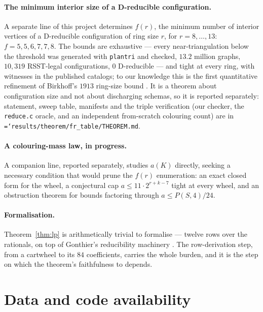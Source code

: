 \documentclass[11pt]{article}
\theoremstyle{definition}
\newcommand{\art}[1]{{\texttt{\hyphenchar\font=`\-\relax #1}}}
\begin{document}
\paragraph{The minimum interior size of a D-reducible configuration.} A separate
line of this project determines $f(r)$, the minimum number of interior vertices
of a D-reducible configuration of ring size $r$, for $r = 8,\dots,13$:
$f = 5,5,6,7,7,8$. The bounds are exhaustive --- every near-triangulation below
the threshold was generated with \texttt{plantri} and checked, $13.2$ million
graphs, $10{,}319$ RSST-legal configurations, $0$ D-reducible --- and tight at
every ring, with witnesses in the published catalogs; to our knowledge this is
the first quantitative refinement of Birkhoff's $1913$ ring-size bound
\cite{birkhoff1913}. It is a theorem about configuration size and not about
discharging schemas, so it is reported separately: statement, sweep table,
manifests and the triple verification (our checker, the \texttt{reduce.c} oracle,
and an independent from-scratch colouring count) are in
\art{results/theorem/fr\_table/THEOREM.md}.

\paragraph{A colouring-mass law, in progress.} A companion line, reported
separately, studies $a(K)$ directly, seeking a necessary condition that would prune
the $f(r)$ enumeration: an exact closed form for the wheel, a conjectural cap
$a \le 11\cdot2^{r+k-7}$ tight at every wheel, and an obstruction theorem for
bounds factoring through $a \le P(S,4)/24$.

\paragraph{Formalisation.} Theorem~\ref{thm:lp} is arithmetically trivial to
formalise --- twelve rows over the rationals, on top of Gonthier's reducibility
machinery \cite{gonthier2008}. The row-derivation step, from a cartwheel to its
$84$ coefficients, carries the whole burden, and it is the step on which the
theorem's faithfulness to \cite{nl4ct2026} depends.

\section*{Data and code availability}
\label{sec:availability}
\end{document}
